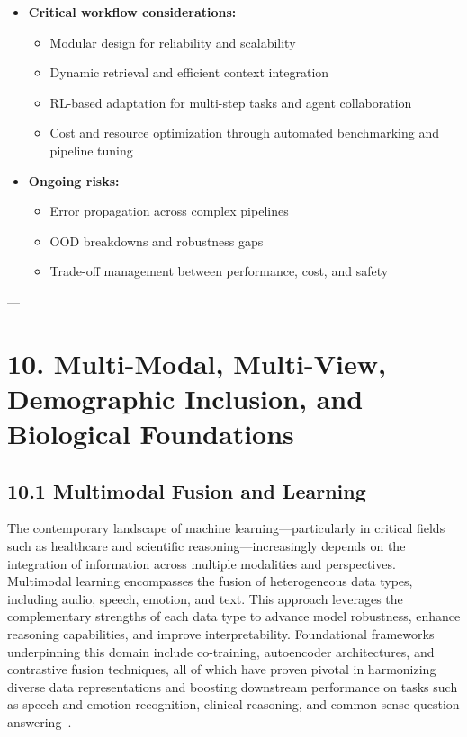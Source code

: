 \documentclass[11pt]{article}
\begin{document}
\begin{itemize}
    \item \textbf{Critical workflow considerations:}
        \begin{itemize}
            \item Modular design for reliability and scalability
            \item Dynamic retrieval and efficient context integration
            \item RL-based adaptation for multi-step tasks and agent collaboration
            \item Cost and resource optimization through automated benchmarking and pipeline tuning
        \end{itemize}
    \item \textbf{Ongoing risks:}
        \begin{itemize}
            \item Error propagation across complex pipelines
            \item OOD breakdowns and robustness gaps
            \item Trade-off management between performance, cost, and safety
        \end{itemize}
\end{itemize}

---

\newpage


\section{10. Multi-Modal, Multi-View, Demographic Inclusion, and Biological Foundations}

\subsection{10.1 Multimodal Fusion and Learning}

The contemporary landscape of machine learning—particularly in critical fields such as healthcare and scientific reasoning—increasingly depends on the integration of information across multiple modalities and perspectives. Multimodal learning encompasses the fusion of heterogeneous data types, including audio, speech, emotion, and text. This approach leverages the complementary strengths of each data type to advance model robustness, enhance reasoning capabilities, and improve interpretability. Foundational frameworks underpinning this domain include co-training, autoencoder architectures, and contrastive fusion techniques, all of which have proven pivotal in harmonizing diverse data representations and boosting downstream performance on tasks such as speech and emotion recognition, clinical reasoning, and common-sense question answering~\cite{79,31,36,46,47,48,49,50,55,60,74,75,80,87,88,89,90}.
\end{document}
